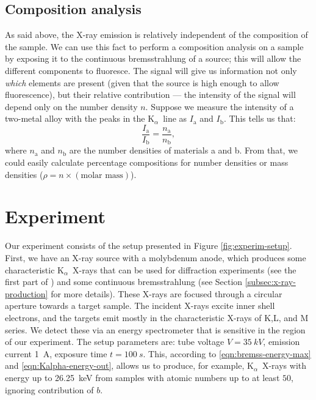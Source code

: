 \documentclass[11pt,a4paper,twoside,onecolumn]{article}
\newcommand{\Kalpha}{$\mathrm{K}_\alpha$~}
\begin{document}
\subsection{Composition analysis}\label{subsec:compos-analysis}
As said above, the X-ray emission is relatively independent of the composition of the sample. We can use this fact to perform a composition analysis on a sample by exposing it to the continuous bremsstrahlung of a source; this will allow the different components to fluoresce. The signal will give us information not only \emph{which} elements are present (given that the source is high enough to allow fluorescence), but their relative contribution --- the intensity of the signal will depend only on the number density $n$. Suppose we measure the intensity of a two-metal alloy with the peaks in the \Kalpha line as $I_\mathrm{a}$ and $I_\mathrm{b}$.
This tells us that:
\begin{equation}
    \frac{I_\mathrm{a}}{I_\mathrm{b}} = \frac{n_\mathrm{a}}{n_\mathrm{b}},
\end{equation}
where $n_\mathrm{a}$ and $n_\mathrm{b}$ are the number densities of materials a and b. From that, we could easily calculate percentage compositions for number densities or mass densities ($\rho = n \times (\text{molar mass})$).

\section{Experiment}\label{sec:experiment}
Our experiment consists of the setup presented in Figure \ref{fig:experim-setup}. First, we have an X-ray source with a molybdenum anode, which produces some characteristic \Kalpha X-rays that can be used for diffraction experiments (see the first part of \cite{OxfPhys2010}) and some continuous bremsstrahlung (see Section \ref{subsec:x-ray-production} for more details). These X-rays are focused through a circular aperture towards a target sample. The incident X-rays excite inner shell electrons, and the targets emit mostly in the characteristic X-rays of K,L, and M series. We detect these via an energy spectrometer that is sensitive in the region of our experiment. The setup parameters are: tube voltage $V = \qty{35}{kV}$, emission current \qty{1}{A}, exposure time $t=\qty{100}{s}$. This, according to \eqref{eqn:bremss-energy-max} and \eqref{eqn:Kalpha-energy-out}, allows us to produce, for example, \Kalpha X-rays with energy up to \qty{26.25}{keV} from samples with atomic numbers up to at least $50$, ignoring contribution of $b$.
\end{document}
